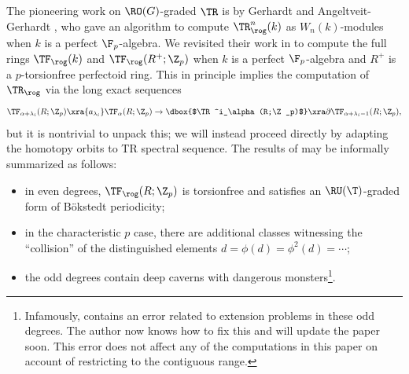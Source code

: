 
The pioneering work on $\RO(G)$-graded $\TR$ is by Gerhardt and Angeltveit-Gerhardt \cite{TeenaTR,ROS1TR}, who gave an algorithm to compute $\TR^n_\rog(k)$ as $W_n(k)$-modules when $k$ is a perfect $\F_p$-algebra. We revisited their work in \cite{SulROGTHH} to compute the full rings $\TF_\rog(k)$ and $\TF_\rog(R^+;\Z_p)$ when $k$ is a perfect $\F_p$-algebra and $R^+$ is a $p$-torsionfree perfectoid ring. This in principle implies the computation of $\TR_\rog$ via the long exact sequences
\[ \TF_{\alpha+\lambda_i}(R;\Z_p) \xra{a_{\lambda_i}} \TF_\alpha(R;\Z_p) \to \dbox{$\TR^i_\alpha(R;\Z_p)$} \xra\partial \TF_{\alpha+\lambda_i-1}(R;\Z_p), \]
but it is nontrivial to unpack this; we will instead proceed directly by adapting the homotopy orbits to TR spectral sequence. The results of \cite{SulROGTHH} may be informally summarized as follows:
\begin{itemize}
  \item in even degrees, $\TF_\rog(R;\Z_p)$ is torsionfree and satisfies an $\RU(\T)$-graded form of B\"okstedt periodicity;
  \item in the characteristic $p$ case, there are additional classes witnessing the ``collision'' of the distinguished elements $d=\phi(d)=\phi^2(d)=\dotsb$;
  \item the odd degrees contain deep caverns with dangerous monsters\footnote{Infamously, \cite{SulROGTHH} contains an error related to extension problems in these odd degrees. The author now knows how to fix this and will update the paper soon. This error does not affect any of the computations in this paper on account of restricting to the contiguous range.}.
\end{itemize}

